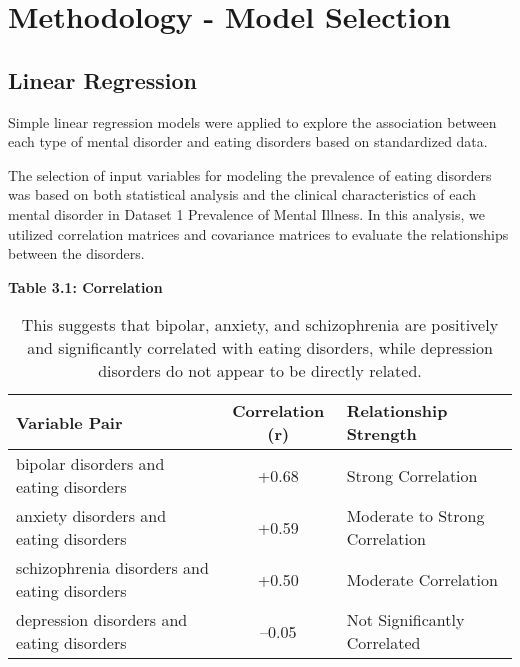 \section{Methodology - Model Selection}
\label{sec:method} %

\subsection{Linear Regression}

Simple linear regression models were applied to explore the association between each type of mental disorder and eating disorders based on standardized data.

The selection of input variables for modeling the prevalence of eating disorders was based on both statistical analysis and the clinical characteristics of each mental disorder in Dataset 1 Prevalence of Mental Illness. In this analysis, we utilized correlation matrices and covariance matrices to evaluate the relationships between the disorders.

\begin{table}[h!]
\centering
\textbf{Table 3.1: Correlation}

\begin{tabular}{||p{5cm} c p{8cm}||} 
 \hline
 \textbf{Variable Pair} & \textbf{Correlation (r)} & \textbf{Relationship Strength} \\
 \hline
 bipolar disorders and eating disorders & +0.68 & Strong Correlation \\ 
 \hline
 anxiety disorders and eating disorders & +0.59 & Moderate to Strong Correlation \\
 \hline
 schizophrenia disorders and eating disorders & +0.50 & Moderate Correlation \\
 \hline
 depression disorders and eating disorders & –0.05 & Not Significantly Correlated \\
 \hline
\end{tabular}
\caption{This suggests that bipolar, anxiety, and schizophrenia are positively and significantly correlated with eating disorders, while depression disorders do not appear to be directly related.}
\label{table:3.1}
\end{table}


